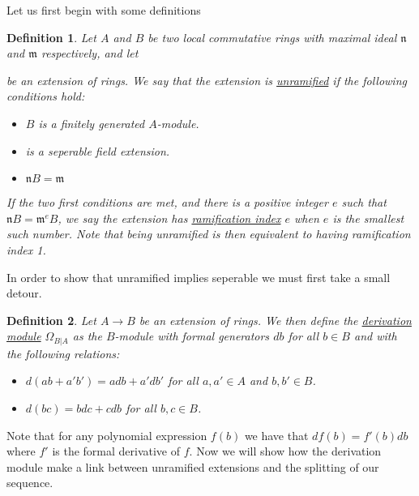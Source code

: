 \documentclass[11pt, a4paper, english]{article}
\numberwithin{prop}{section}
\numberwithin{lemma}{section}
\numberwithin{theorem}{section}
\newtheorem{defin}{Definition}
\numberwithin{defin}{section}
\numberwithin{example}{section}
\begin{document}
Let us first begin with some definitions
\begin{defin}
Let $A$ and $B$ be two local commutative rings with maximal ideal $\mathfrak{n}$ and $\mathfrak{m}$ respectively, and let 
be an extension of rings. We say that the extension is \underline{unramified} if the following conditions hold:
\begin{itemize}
\item $B$ is a finitely generated $A$-module.
\item {}
is a seperable field extension.
\item $\mathfrak{n}B = \mathfrak{m}$
\end{itemize}
If the two first conditions are met, and there is a positive integer $e$ such that $\mathfrak{n} B = \mathfrak{m}^e B$, we say the extension has \underline{ramification index} $e$ when $e$ is the smallest such number. Note that being unramified is then equivalent to having ramification index 1. 
\end{defin}

In order to show that unramified implies seperable we must first take a small detour.

\begin{defin}
Let $A \to B$ be an extension of rings. We then define the \underline{derivation module} $\Omega_{B | A}$ as the $B$-module with formal generators $db$ for all $b \in B$ and with the following relations:
\begin{itemize}
\item[$A$-linearity:] $d(ab + a'b') = adb + a'db'$ for all $a, a' \in A$ and $b, b' \in B$.
\item[Leibniz rule:] $d(bc) = bdc + cdb$ for all $b,c \in B$.
\end{itemize} 
\end{defin}
Note that for any polynomial expression $f(b)$ we have that $df(b) = f'(b)db$ where $f'$ is the formal derivative of $f$. Now we will show how the derivation module make a link between unramified extensions and the splitting of our sequence.
\end{document}
